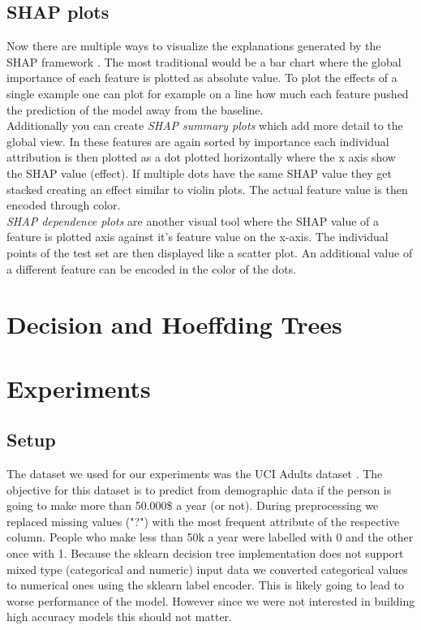 \documentclass[conference]{IEEEtran}
\begin{document}
\subsection{SHAP plots}
Now there are multiple ways to visualize the explanations generated by the SHAP framework \cite{b1}.
The most traditional would be a bar chart where the global importance of each feature is plotted as absolute value. To plot the effects of a single example one can plot for example on a line how much each feature pushed the prediction of the model away from the baseline.\\
Additionally you can create \textit{SHAP summary plots} which add more detail to the global view. In these features are again sorted by importance each individual attribution is then plotted as a dot plotted horizontally where the x axis show the SHAP value (effect). If multiple dots have the same SHAP value they get stacked creating an effect similar to violin plots. The actual feature value is then encoded through color.\\
\textit{SHAP dependence plots} are another visual tool where the SHAP value of a feature is plotted axis against it's feature value on the x-axis. The individual points of the test set are then displayed like a scatter plot. An additional value of a different feature can be encoded in the color of the dots.


\section{Decision and Hoeffding Trees}



\section{Experiments}


\subsection{Setup}
The dataset we used for our experiments was the UCI Adults dataset \cite{b15}. 
The objective for this dataset is to predict from demographic data if the person is going to make more than 50.000\$ a year (or not).
During preprocessing we replaced missing values ("?")  with the most frequent attribute of the respective column.
People who make less than 50k a year were labelled with 0 and the other once with 1.
Because the sklearn decision tree implementation does not support mixed type (categorical and numeric) input data we converted categorical values to numerical ones using the sklearn label encoder. 
This is likely going to lead to worse performance of the model.
However since we were not interested in building high accuracy models this should not matter.\\
\end{document}
